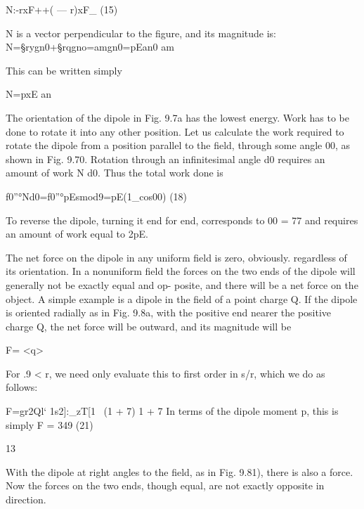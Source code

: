 {\begin{equation}
\end{equation}
N:-rxF++( --- r)xF_ (15)

N is a vector perpendicular to the figure, and its magnitude is:
N=§rygn0+§rqgno=amgn0=pEan0 am

This can be written simply

\begin{equation}
\end{equation}
N=pxE an

  

The orientation of the dipole in Fig. 9.7a has the lowest energy.
Work has to be done to rotate it into any other position. Let us calculate
the work required to rotate the dipole from a position parallel
to the field, through some angle 00, as shown in Fig. 9.70. Rotation
through an infinitesimal angle d0 requires an amount of work N d0.
Thus the total work done is

\begin{equation}
\end{equation}
f0''°Nd0=f0''°pEsmod9=pE(1_cos00) (18)

To reverse the dipole, turning it end for end, corresponds to 00 = 77
and requires an amount of work equal to 2pE.

The net force on the dipole in any uniform field is zero, obviously.
regardless of its orientation. In a nonuniform field the forces on the
two ends of the dipole will generally not be exactly equal and op-
posite, and there will be a net force on the object. A simple example
is a dipole in the field of a point charge Q. If the dipole is oriented
radially as in Fig. 9.8a, with the positive end nearer the positive
charge Q, the net force will be outward, and its magnitude will be

\begin{equation}
\end{equation}
F= <q>%

For .9 < r, we need only evaluate this to first order in s/r, which we
do as follows:

\begin{equation}
\end{equation}
F=gr2Ql‘ 1s2]:_zT[1~%
(1 + 7) 1 + 7
In terms of the dipole moment p, this is simply
F = 349 (21)

13

With the dipole at right angles to the field, as in Fig. 9.81), there is
also a force. Now the forces on the two ends, though equal, are not
exactly opposite in direction.

}
